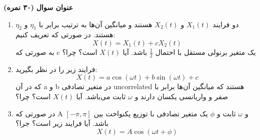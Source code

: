 \Large \textbf{عنوان سوال}
\large \textbf{(۳۰ نمره)}

\normalsize \vspace{0.5cm}

\begin{enumerate}[label=(\alph*)]
	\item
	دو فرایند
	${X_1}\left( t \right)$
	و
	${X_2}\left( t \right)$
	هستند و میانگین آن‌ها به ترتیب برابر با
	${\eta _1}$
	و
	${\eta _2}$
	هستند. در صورتی که تعریف کنیم:
	$$
	X\left( t \right) = {X_1}\left( t \right) + c{X_2}\left( t \right)
	$$
	به صورتی که c یک متغیر برنولی مستقل با احتمال
	$\frac{1}{2}$
	باشد. آیا
	$X\left( t \right)$
	است؟ چرا؟
	\item 
	فرایند زیر را در نظر بگیرید:
	$$
	X\left( t \right) = a\cos \left( {\omega t} \right) + b\sin \left( {\omega t} \right) + c
	$$
	که در آن a و b در متغیر تصادفی uncorrelated هستند که میانگین آن‌ها برابر با صفر و واریانسی یکسان دارند و
	$\omega $
	ثابت می‌باشد. آیا
	$X\left( t \right)$
	است؟ چرا؟
	\item
	در صورتی که A و 
	$\omega $
	ثابت و
	$\phi $
	یک متغیر تصادفی با توزیع یکنواخت بین
	$\left[ { - \pi ,\pi } \right]$
	باشد. آیا فرایند زیر
	است؟ جرا؟
	$$
	X\left( t \right) = A\cos \left( {\omega t + \phi } \right)
	$$
\end{enumerate}


